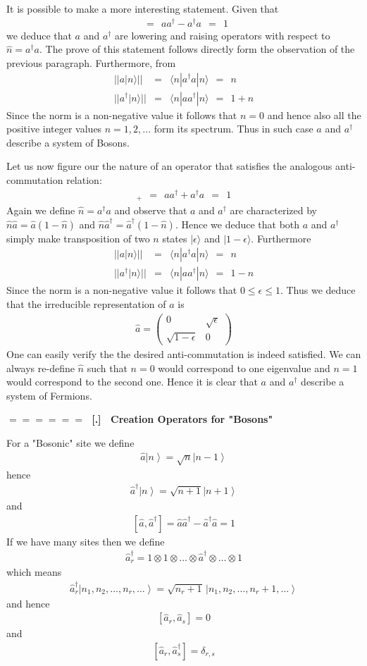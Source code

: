\documentclass[onecolumn,fleqn]{revtex4}
\newcommand{\beq}{\begin{eqnarray}}
\newcommand{\eeq}{\end{eqnarray}}
\renewcommand{\thesubsection}{\arabic{subsection}}
\renewcommand{\thesubsubsection}{\arabic{subsubsection}}
\newcommand{\sheadC}[1]
{
\addtocounter{subsubsection}{1}
\vspace{5mm}
{\Large\bf $=\!=\!=\!=\!=\!=\;$ [\thesubsection.\thesubsubsection] \ #1}  
\nopagebreak
\phantomsection
}
\begin{document}
It is possible to make a more 
interesting statement. Given that 
\beq
[a,a^{\dag}] \ \ = \ \ aa^{\dag}-a^{\dag}a \ \ = \ \  1
\eeq
we deduce that $a$ and $a^{\dag}$ 
are lowering and raising operators 
with respect to $\hat{n}=a^{\dag}a$.
The prove of this statement 
follows directly form the observation 
of the previous paragraph.
Furthermore, from 
\beq
|| a|n\rangle || &=& \langle n| a^{\dag} a |n\rangle  \ \ = \ \ n
\\ 
|| a^{\dag} |n\rangle || &=& \langle n| a a^{\dag} |n\rangle  \ \ = \ \ 1 + n
\eeq
Since the norm is a non-negative value it follows 
that $n=0$ and hence also all the positive 
integer values $n=1,2,...$ form its spectrum. 
Thus in such case $a$ and $a^{\dag}$  
describe a system of Bosons.


Let us now figure our the nature of 
an operator that satisfies the analogous 
anti-commutation relation:
\beq
[a,a^{\dag}]_{+} \ \ = \ \ aa^{\dag}+a^{\dag}a \ \ = \ \  1
\eeq
Again we define $\hat{n}=a^{\dag}a$
and observe that $a$ and $a^{\dag}$ are characterized 
by ${\hat{n}\hat{a} = \hat{a}(1-\hat{n})}$
and ${\hat{n}\hat{a}^{\dag} = \hat{a}^{\dag}(1-\hat{n})}$. 
Hence we deduce that both $a$ and $a^{\dag}$ 
simply make transposition of two $n$ 
states ${|\epsilon\rangle}$ and ${|1{-}\epsilon\rangle}$. 
Furthermore 
\beq
|| a|n\rangle || &=& \langle n| a^{\dag} a |n\rangle  \ \ = \ \ n
\\ 
|| a^{\dag} |n\rangle || &=& \langle n| a a^{\dag} |n\rangle  \ \ = \ \ 1 - n
\eeq
Since the norm is a non-negative value 
it follows that ${0\le\epsilon\le1}$. 
Thus we deduce that the irreducible 
representation of $a$ is 
\beq
\hat{a}= 
\begin{pmatrix} 
0 & \sqrt{\epsilon}\\ 
\sqrt{1{-}\epsilon} & 0 
\end{pmatrix} 
\eeq
One can easily verify the the desired 
anti-commutation is indeed satisfied.
We can always re-define $\hat{n}$ 
such that ${n{=}0}$ would correspond 
to one eigenvalue and ${n{=}1}$ 
would correspond to the second one. 
Hence it is clear that $a$ and $a^{\dag}$  
describe a system of Fermions.


\sheadC{Creation Operators for "Bosons"} 

For a "Bosonic" site we define 
\beq
\hat{a}\left\vert n\right\rangle =\sqrt{n}\left\vert n-1\right\rangle 
\eeq
hence
\beq
\hat{a}^{\dag}\left\vert n\right\rangle =\sqrt{n+1}\left\vert 
n+1\right\rangle 
\eeq
and
\beq
\left[ \hat{a},\hat{a}^{\dag}\right] 
=\hat{a}\hat{a}^{\dag}-\hat{a}^{\dag}\hat{a}=1
\eeq
If we have many sites then we define
\beq
\hat{a}_{r}^{\dag}
=1\otimes1\otimes \dots \otimes\hat{a}^{\dag}\otimes  \dots \otimes1
\eeq
which means 
\beq
\hat{a}_{r}^{\dag}\left\vert n_{1},n_{2}, \dots ,n_{r},\dots \right\rangle 
=\sqrt{n_{r}+1} \, \left\vert n_{1},n_{2}, \dots ,n_{r}+1,\dots \right\rangle 
\eeq
and hence
\beq
\left[  \hat{a}_{r},\hat{a}_{s}\right] =0 
\eeq
and
\beq
\left[  \hat{a}_{r},\hat{a}_{s}^{\dag} \right] = \delta_{r,s} 
\eeq
\end{document}
